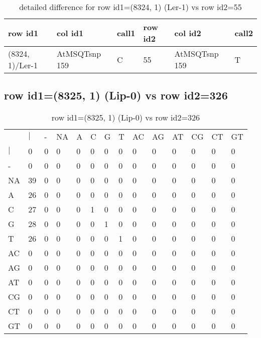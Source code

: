\begin{center}
\begin{longtable}{|l|l|l|l|l|l|}
\caption{detailed difference for row id1=(8324, 1) (Ler-1) vs row id2=55} \label{table_dm521}\\
\hline
row id1&col id1&call1&row id2&col id2&call2\\
\hline
(8324, 1)/Ler-1&AtMSQTsnp 159&C&55&AtMSQTsnp 159&T\\
\hline
\end{longtable}
\end{center}

\subsection{row id1=(8325, 1) (Lip-0) vs row id2=326}
\begin{center}
\begin{longtable}{|l|l|l|l|l|l|l|l|l|l|l|l|l|l|}
\caption{row id1=(8325, 1) (Lip-0) vs row id2=326} \label{table_dm522}\\
\hline
\\
\hline
&$|$&-&NA&A&C&G&T&AC&AG&AT&CG&CT&GT\\
$|$&0&0&0&0&0&0&0&0&0&0&0&0&0\\
-&0&0&0&0&0&0&0&0&0&0&0&0&0\\
NA&39&0&0&0&0&0&0&0&0&0&0&0&0\\
A&26&0&0&0&0&0&0&0&0&0&0&0&0\\
C&27&0&0&0&1&0&0&0&0&0&0&0&0\\
G&28&0&0&0&0&1&0&0&0&0&0&0&0\\
T&26&0&0&0&0&0&1&0&0&0&0&0&0\\
AC&0&0&0&0&0&0&0&0&0&0&0&0&0\\
AG&0&0&0&0&0&0&0&0&0&0&0&0&0\\
AT&0&0&0&0&0&0&0&0&0&0&0&0&0\\
CG&0&0&0&0&0&0&0&0&0&0&0&0&0\\
CT&0&0&0&0&0&0&0&0&0&0&0&0&0\\
GT&0&0&0&0&0&0&0&0&0&0&0&0&0\\
\hline
\end{longtable}
\end{center}

